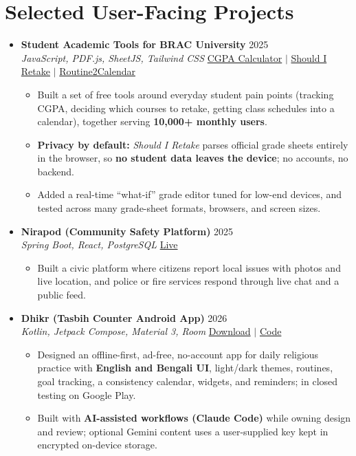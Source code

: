 \documentclass[a4paper]{article}
\newcommand{\resumeItem}[1]{
  \item\small{
    {#1 \vspace{-2pt}}
  }
}
\newcommand{\resumeItemListStart}{\begin{itemize}}
\newcommand{\resumeItemListEnd}{\end{itemize}\vspace{-5pt}}
\begin{document}
\section{Selected User-Facing Projects}
  \begin{itemize}[leftmargin=0.15in, label={}, itemsep=5pt]

    \item
    \textbf{Student Academic Tools for BRAC University} \hfill 2025\\
    \small\textit{JavaScript, PDF.js, SheetJS, Tailwind CSS} \hfill
    \href{https://badhon495.github.io/bracu-cgpa-calculator/}{CGPA Calculator} $|$
    \href{https://badhon495.github.io/should-i-retake/}{Should I Retake} $|$
    \href{https://badhon495.github.io/Routine2Calendar/}{Routine2Calendar}
    \vspace{-5pt}
    \resumeItemListStart
      \resumeItem{Built a set of free tools around everyday student pain points (tracking CGPA, deciding which courses to retake, getting class schedules into a calendar), together serving \textbf{10,000+ monthly users}.}
      \resumeItem{\textbf{Privacy by default:} \textit{Should I Retake} parses official grade sheets entirely in the browser, so \textbf{no student data leaves the device}; no accounts, no backend.}
      \resumeItem{Added a real-time ``what-if'' grade editor tuned for low-end devices, and tested across many grade-sheet formats, browsers, and screen sizes.}
    \resumeItemListEnd

    \item
    \textbf{Nirapod (Community Safety Platform)} \hfill 2025\\
    \small\textit{Spring Boot, React, PostgreSQL} \hfill
    \href{https://nirapod.netlify.app/}{Live}
    \vspace{-5pt}
    \resumeItemListStart
      \resumeItem{Built a civic platform where citizens report local issues with photos and live location, and police or fire services respond through live chat and a public feed.}
    \resumeItemListEnd

    \item
    \textbf{Dhikr (Tasbih Counter Android App)} \hfill 2026\\
    \small\textit{Kotlin, Jetpack Compose, Material 3, Room} \hfill
    \href{https://github.com/badhon495/Dhikr/releases}{Download} $|$
    \href{https://github.com/badhon495/Dhikr}{Code}
    \vspace{-5pt}
    \resumeItemListStart
      \resumeItem{Designed an offline-first, ad-free, no-account app for daily religious practice with \textbf{English and Bengali UI}, light/dark themes, routines, goal tracking, a consistency calendar, widgets, and reminders; in closed testing on Google Play.}
      \resumeItem{Built with \textbf{AI-assisted workflows (Claude Code)} while owning design and review; optional Gemini content uses a user-supplied key kept in encrypted on-device storage.}
    \resumeItemListEnd


\end{itemize}
\end{document}
